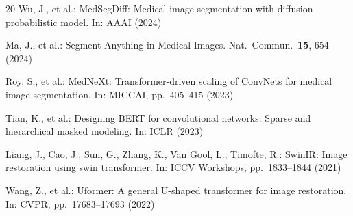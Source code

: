\documentclass[runningheads]{llncs}
\begin{document}
\begin{thebibliography}{20}
Wu, J., et al.: MedSegDiff: Medical image segmentation with diffusion probabilistic model.
In: AAAI (2024)

Ma, J., et al.: Segment Anything in Medical Images.
Nat.\ Commun.\ \textbf{15}, 654 (2024)

Roy, S., et al.: MedNeXt: Transformer-driven scaling of ConvNets for medical image segmentation.
In: MICCAI, pp.~405–415 (2023)

Tian, K., et al.: Designing BERT for convolutional networks: Sparse and hierarchical masked modeling.
In: ICLR (2023)

Liang, J., Cao, J., Sun, G., Zhang, K., Van Gool, L., Timofte, R.:
SwinIR: Image restoration using swin transformer.
In: ICCV Workshops, pp.~1833–1844 (2021)

Wang, Z., et al.: Uformer: A general U-shaped transformer for image restoration.
In: CVPR, pp.~17683–17693 (2022)

\end{thebibliography}
\end{document}
